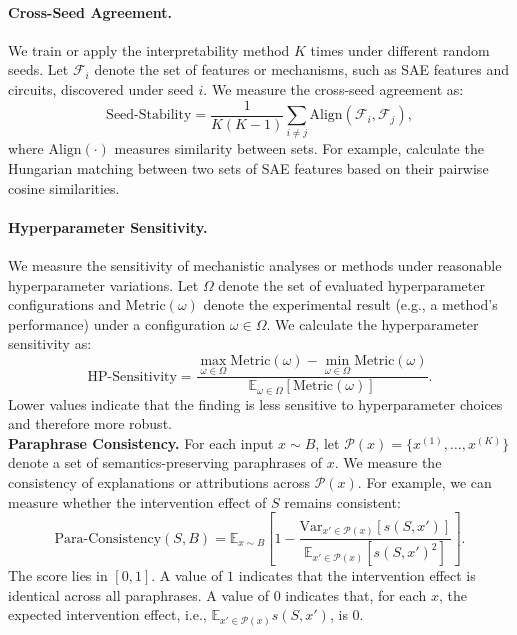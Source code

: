 \begin{definitionbox}
\paragraph{Cross-Seed Agreement.} We train or apply the interpretability method $K$ times under different random seeds. Let $\mathcal{F}_i$ denote the set of features or mechanisms, such as SAE features and circuits, discovered under seed $i$. We measure the cross-seed agreement as:
\[
\text{Seed-Stability} = \frac{1}{K(K-1)} \sum_{i \neq j} \text{Align}(\mathcal{F}_i, \mathcal{F}_j),
\]
where $\text{Align}(\cdot)$ measures similarity between sets. For example,  calculate the Hungarian matching between two sets of SAE features based on their pairwise cosine similarities.\\

\paragraph{Hyperparameter Sensitivity.} We measure the sensitivity of mechanistic analyses or methods under reasonable hyperparameter variations. Let $\Omega$ denote the set of evaluated hyperparameter configurations and $\text{Metric}(\omega)$ denote the experimental result (e.g., a method's performance) under a configuration $\omega \in \Omega$. We calculate the hyperparameter sensitivity as:
\[
\text{HP-Sensitivity}
=
\frac{
\max_{\omega \in \Omega} \text{Metric}(\omega)
-
\min_{\omega \in \Omega} \text{Metric}(\omega)
}{
\mathbb{E}_{\omega \in \Omega}[\text{Metric}(\omega)]
}.
\]
Lower values indicate that the finding is less sensitive to hyperparameter choices and therefore more robust.\\

\textbf{Paraphrase Consistency.} For each input $x \sim B$, let $\mathcal{P}(x) = \{x^{(1)}, \dots, x^{(K)}\}$ denote a set of semantics-preserving paraphrases of $x$. We measure the consistency of explanations or attributions across $\mathcal{P}(x)$. For example, we can measure whether the intervention effect of $S$ remains consistent:
\[
\text{Para-Consistency}(S, B)
= \mathbb{E}_{x \sim B}\left[
 1 - \frac{\mathrm{Var}_{x' \in \mathcal{P}(x)}\left[s(S, x')\right]}
          {\mathbb{E}_{x' \in \mathcal{P}(x)}\left[s(S, x')^2\right]}
\right].
\]
The score lies in $[0, 1]$. A value of $1$ indicates that the intervention effect is identical across all paraphrases. A value of $0$ indicates that, for each $x$, the expected intervention effect, i.e., $\mathbb{E}_{x' \in \mathcal{P}(x)}s(S, x')$, is 0.
\end{definitionbox}

